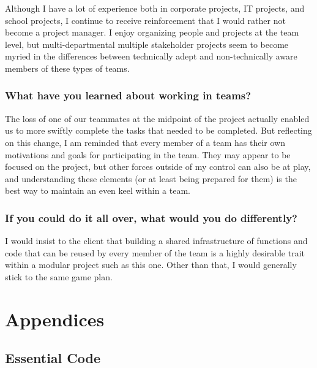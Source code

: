 \documentclass[11pt]{scrreprt}
\begin{document}
Although I have a lot of experience both in corporate projects, IT projects, and school projects, I continue to receive reinforcement that I would rather not become a project manager. I enjoy organizing people and projects at the team level, but multi-departmental multiple stakeholder projects seem to become myried in the differences between technically adept and non-technically aware members of these types of teams.

\subsection{What have you learned about working in teams?}

The loss of one of our teammates at the midpoint of the project actually enabled us to more swiftly complete the tasks that needed to be completed.
But reflecting on this change, I am reminded that every member of a team has their own motivations and goals for participating in the team.
They may appear to be focused on the project, but other forces outside of my control can also be at play, and understanding these elements (or at least being prepared for them) is the best way to maintain an even keel within a team.

\subsection{If you could do it all over, what would you do differently?}

I would insist to the client that building a shared infrastructure of functions and code that can be reused by every member of the team is a highly desirable trait within a modular project such as this one. Other than that, I would generally stick to the same game plan.

\chapter{Appendices}

\section{Essential Code}
\end{document}

